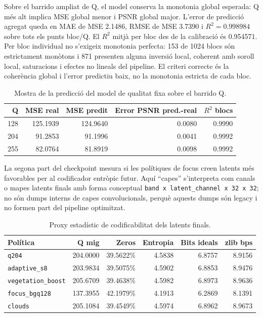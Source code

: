 \documentclass[11pt,a4paper]{article}
\begin{document}
Sobre el barrido ampliat de Q, el model conserva la monotonia global esperada: Q més alt implica MSE global menor i PSNR global major. L'error de predicció agregat queda en MAE de MSE 2.1486, RMSE de MSE 3.7390 i $R^2=0.998984$ sobre tots els punts bloc/Q. El $R^2$ mitjà per bloc des de la calibració és 0.954571. Per bloc individual no s'exigeix monotonia perfecta: 153 de 1024 blocs són estrictament monòtons i 871 presenten alguna inversió local, coherent amb soroll local, saturacions i efectes no lineals del pipeline. El criteri correcte és la coherència global i l'error predictiu baix, no la monotonia estricta de cada bloc.

\begin{table}[H]
\centering
\begin{tabular}{rrrrr}
\toprule
\textbf{Q} & \textbf{MSE real} & \textbf{MSE predit} & \textbf{Error PSNR pred.-real} & \textbf{$R^2$ blocs} \\
\midrule
128 & 125.1939 & 124.9640 & 0.0080 & 0.9990 \\
204 & 91.2853 & 91.1996 & 0.0041 & 0.9992 \\
255 & 82.0764 & 81.8919 & 0.0098 & 0.9992 \\
\bottomrule
\end{tabular}
\caption{Mostra de la predicció del model de qualitat fixa sobre el barrido Q.}
\end{table}

La segona part del checkpoint mesura si les polítiques de focus creen latents més favorables per al codificador entròpic futur. Aquí ``capes'' s'interpreta com canals o mapes latents finals amb forma conceptual \texttt{band x latent\_channel x 32 x 32}; no són dumps interns de capes convolucionals, perquè aquests dumps són legacy i no formen part del pipeline optimitzat.

\begin{table}[H]
\centering
\begin{tabular}{lrrrrr}
\toprule
\textbf{Política} & \textbf{Q mig} & \textbf{Zeros} & \textbf{Entropia} & \textbf{Bits ideals} & \textbf{zlib bps} \\
\midrule
\texttt{q204} & 204.0000 & 39.5622\% & 4.5838 & 6.8757 & 8.9156 \\
\texttt{adaptive\_s8} & 203.9834 & 39.5075\% & 4.5902 & 6.8853 & 8.9476 \\
\texttt{vegetation\_boost} & 205.6709 & 39.4638\% & 4.5982 & 6.8973 & 8.9636 \\
\texttt{focus\_bgq128} & 137.3955 & 42.1979\% & 4.1913 & 6.2869 & 8.1391 \\
\texttt{clouds} & 205.1084 & 39.4549\% & 4.5974 & 6.8962 & 8.9673 \\
\bottomrule
\end{tabular}
\caption{Proxy estadístic de codificabilitat dels latents finals.}
\end{table}
\end{document}
